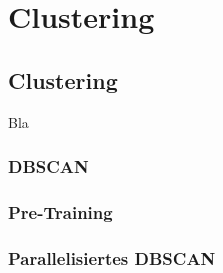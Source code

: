 
\chapter{Clustering} %

\label{Chapter7} %


\section{Clustering}
Bla

  \subsection{DBSCAN}

  \subsection{Pre-Training}

  \subsection{Parallelisiertes DBSCAN}
